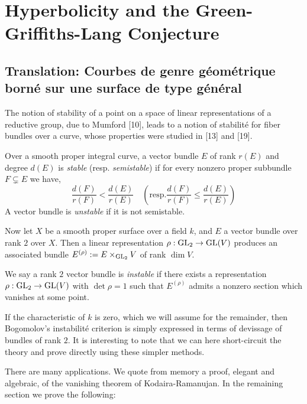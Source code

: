 \documentclass[main.tex]{subfiles}
\begin{document}
\chapter{Hyperbolicity and the Green-Griffiths-Lang Conjecture}



\section{Translation: Courbes de genre g\'{e}om\'{e}trique born\'{e} sur une surface de type g\'{e}n\'{e}ral}


The notion of stability of a point on a space of linear representations of a reductive group, due to Mumford [10], leads to a notion of stabilit\'{e} for fiber bundles over a curve, whose properties were studied in [13] and [19].

\begin{defn}
Over a smooth proper integral curve, a vector bundle $E$ of rank $r(E)$ and degree $d(E)$ is \textit{stable} (resp. \textit{semistable}) if for every nonzero proper subbundle $F \subsetneq E$ we have,
\[ \frac{d(F)}{r(F)} < \frac{d(E)}{r(E)} \quad \left( \text{resp.} \frac{d(F)}{r(F)} \le \frac{d(E)}{r(E)} \right) \]
A vector bundle is \textit{unstable} if it is not semistable.
\end{defn}

Now let $X$ be a smooth proper surface over a field $k$, and $E$ a vector bundle over rank $2$ over $X$. Then a linear representation $\rho : \mathrm{GL}_2 \to \mathrm{GL}(V)$ produces an associated bundle $E^{(\rho)} := E \times_{\mathrm{GL}_2} V$ of rank $\dim{V}$.

\begin{defn}
We say a rank $2$ vector bundle is \textit{instable} if there exists a representation $\rho : \mathrm{GL}_2 \to \mathrm{GL}(V)$ with $\det{\rho} = 1$ such that $E^{(\rho)}$ admits a nonzero section which vanishes at some point.
\end{defn}

If the characteristic of $k$ is zero, which we will assume for the remainder, then Bogomolov's instabilit\'{e} criterion is simply expressed in terms of devissage of bundles of rank $2$. It is interesting to note that we can here short-circuit the theory and prove directly using these simpler methods.
\par
There are many applications. We quote from memory a proof, elegant and algebraic, of the vanishing theorem of Kodaira-Ramanujan. In the remaining section we prove the following:
\end{document}
